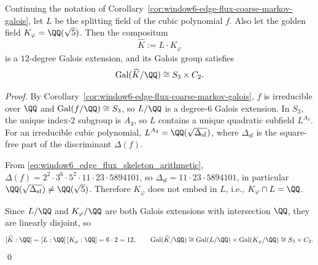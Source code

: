 \begin{corollary}\label{cor:window6-golden-s3c2-audit-cover-degree12}
Continuing the notation of Corollary~\ref{cor:window6-edge-flux-coarse-markov-galois}, let \(L\) be the splitting field of the cubic polynomial \(f\).
Also let the golden field \(K_\varphi=\QQ(\sqrt5)\).
Then the compositum
\[
\widehat K:=L\cdot K_\varphi
\]
is a \(12\)-degree Galois extension, and its Galois group satisfies
\[
\mathrm{Gal}(\widehat K/\QQ)\cong S_3\times C_2.
\]
\end{corollary}
\begin{proof}
By Corollary~\ref{cor:window6-edge-flux-coarse-markov-galois}, \(f\) is irreducible over \(\QQ\) and \(\mathrm{Gal}(f/\QQ)\cong S_3\), so \(L/\QQ\) is a degree-\(6\) Galois extension.
In \(S_3\), the unique index-\(2\) subgroup is \(A_3\), so \(L\) contains a unique quadratic subfield \(L^{A_3}\).
For an irreducible cubic polynomial, \(L^{A_3}=\QQ(\sqrt{\Delta_{\mathrm{sf}}})\), where \(\Delta_{\mathrm{sf}}\) is the square-free part of the discriminant \(\Delta(f)\).
\par
From \eqref{eq:window6_edge_flux_skeleton_arithmetic},
\(
\Delta(f)=2^2\cdot 3^6\cdot 5^2\cdot 11\cdot 23\cdot 5894101
\),
so \(\Delta_{\mathrm{sf}}=11\cdot 23\cdot 5894101\), in particular \(\QQ(\sqrt{\Delta_{\mathrm{sf}}})\neq \QQ(\sqrt5)\).
Therefore \(K_\varphi\) does not embed in \(L\), i.e., \(K_\varphi\cap L=\QQ\).
\par
Since \(L/\QQ\) and \(K_\varphi/\QQ\) are both Galois extensions with intersection \(\QQ\), they are linearly disjoint, so
\[
[\widehat K:\QQ]=[L:\QQ]\,[K_\varphi:\QQ]=6\cdot 2=12,
\qquad
\mathrm{Gal}(\widehat K/\QQ)\cong \mathrm{Gal}(L/\QQ)\times \mathrm{Gal}(K_\varphi/\QQ)\cong S_3\times C_2.
\]
\qed
\end{proof}

